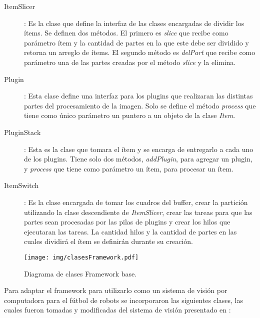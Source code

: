 \begin{description}
\item[ItemSlicer]: Es la clase que define la interfaz de las clases encargadas
	de dividir los ítems. Se definen dos métodos. El primero es \emph{slice}
	que recibe como parámetro ítem y la cantidad de partes en la que este
	debe ser dividido y retorna un arreglo de ítems. El segundo método es
	\emph{delPart} que recibe como parámetro una de las partes creadas por
	el método \emph{slice} y la elimina.

\item[Plugin]: Esta clase define una interfaz para los plugins que realizaran
	las distintas partes del procesamiento de la imagen. Solo se define el
	método \emph{process} que tiene como único parámetro un puntero a un
	objeto de la clase \emph{Item}.

\item[PluginStack]: Esta es la clase que tomara el ítem y se encarga de
	entregarlo a cada uno de los plugins. Tiene solo dos métodos,
	\emph{addPlugin}, para agregar un plugin, y \emph{process} que tiene
	como parámetro un ítem, para procesar un ítem.

\item[ItemSwitch]: Es la clase encargada de tomar los cuadros del buffer, crear
	la partición utilizando la clase descendiente de \emph{ItemSlicer},
	crear las tareas para que las partes sean procesadas por las pilas de
	plugins y crear los hilos que ejecutaran las tareas. La cantidad hilos y
	la cantidad de partes en las cuales dividirá el ítem se definirán
	durante su creación.

\end{description}

\begin{figure}[h]

	\texttt{[image: img/clasesFramework.pdf]}

	\caption{Diagrama de clases Framework base.}

\end{figure}

Para adaptar el framework para utilizarlo como un sistema de visión por
computadora para el fútbol de robots se incorporaron las siguientes clases, las
cuales fueron tomadas y modificadas del sistema de visión presentado en
\cite{torres2014}:


